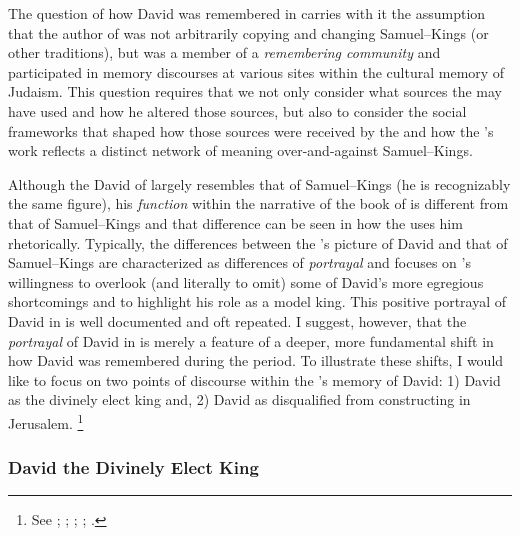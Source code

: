 The question of how David was remembered in \chronicles carries with it the assumption that the author of \chronicles was not arbitrarily copying and changing Samuel--Kings (or other traditions), but was a member of a \emph{remembering community} and participated in memory discourses at various sites within the cultural memory of \secondtemple Judaism. This question requires that we not only consider what sources the \chronicler may have used and how he altered those sources, but also to consider the social frameworks that shaped how those sources were received by the \chronicler and how the \chronicler's work reflects a distinct network of meaning over-and-against Samuel--Kings.

Although the David of \chronicles largely resembles that of Samuel--Kings (he is recognizably the same figure), his \emph{function} within the narrative of the book of \chronicles is different from that of Samuel--Kings and that difference can be seen in how the \chronicler uses him rhetorically. Typically, the differences between the \chronicler's picture of David and that of Samuel--Kings are characterized as differences of \emph{portrayal} and focuses on \chronicler's willingness to overlook (and literally to omit) some of David's more egregious shortcomings and to highlight his role as a model king. This positive portrayal of David in \chronicles is well documented and oft repeated. I suggest, however, that the \emph{portrayal} of David in \chronicles is merely a feature of a deeper, more fundamental shift in how David was remembered during the \secondtemple period. To illustrate these shifts, I would like to focus on two points of discourse within the \chronicler's memory of David: 1) David as the divinely elect king and, 2) David as disqualified from constructing \thetemple in Jerusalem.%
    \footnote{See \cite{jarick_frohlich2019}; \cite[347--383]{japhet2009} \cite{knoppers_biblica1995}; \cite[47--48]{japhet1993}; \cite[44--48]{klein2006}; \cite[80--85]{knoppers2003}.}

\subsubsection{David the Divinely Elect King}

